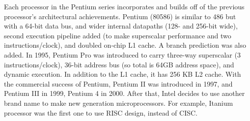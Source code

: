 \documentclass[doc,natbib,12pt]{apa6}
\begin{document}
	Each processor in the Pentium series incorporates and builds off of the previous processor’s architectural achievements. \citep{Dandamudi2003} Pentium (80586) is similar to 486 but with a 64-bit data bus, and wider internal datapaths (128- and 256-bit wide), second execution pipeline added (to make superscalar performance and two instructions/clock), and doubled on-chip L1 cache. A branch prediction was also added. In 1995, Pentium Pro was introduced to carry three-way superscalar (3 instructions/clock), 36-bit address bus (so total is 64GB address space), and dynamic execution. In addition to the L1 cache, it has 256 KB L2 cache. With the commercial success of Pentium, Pentium II was introduced in 1997, and Pentium III in 1999, Pentium 4 in 2000. After that, Intel decides to use another brand name to make new generation microprocessors. For example, Itanium processor was the first one to use RISC design, instead of CISC.
	
\end{document}
